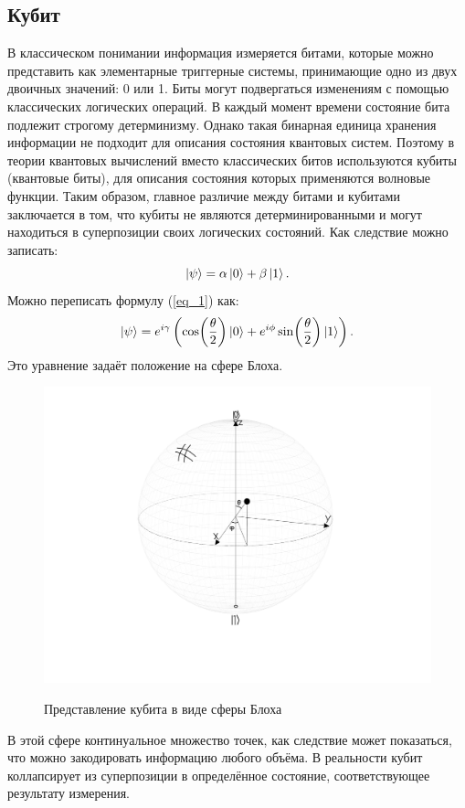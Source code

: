 \documentclass[12pt,a4paper]{article}
\begin{document}
	\subsection{Кубит}
	В классическом понимании информация измеряется битами, которые можно представить как элементарные триггерные системы, принимающие одно из двух двоичных значений: 0 или 1. Биты могут подвергаться изменениям с помощью классических логических операций. В каждый момент времени состояние бита подлежит строгому детерминизму. Однако такая бинарная единица хранения информации не подходит для описания состояния квантовых систем. Поэтому в теории квантовых вычислений вместо классических битов используются кубиты (квантовые биты), для описания состояния которых применяются волновые функции. Таким образом, главное различие между битами и кубитами заключается в том, что кубиты не являются детерминированными и могут находиться в суперпозиции своих логических состояний\cite{1}.
	Как следствие можно записать:\\
	\begin{equation} \label{eq_1}
		\ket{\psi}=\alpha\ket{0}+\beta\ket{1}.
	\end{equation}
	Можно переписать формулу (\ref{eq_1}) как:
	\begin{equation} \label{eq_2}
		\ket{\psi}=e^{i\gamma}\left(\cos(\frac{\theta}{2})\ket{0}+e^{i\phi}\sin(\frac{\theta}{2})\ket{1}\right).
	\end{equation}
	Это уравнение задаёт положение на сфере Блоха. \\
	\begin{figure}[h!]
		\centering
		\includegraphics[width=0.7\linewidth]{2.jpg}
		\label{fig_2}\caption{Представление кубита в виде сферы Блоха}
	\end{figure}
	
	В этой сфере континуальное множество точек, как следствие может показаться, что можно закодировать информацию любого объёма. В реальности кубит коллапсирует из суперпозиции в определённое состояние, соответствующее результату измерения.\\
	
\end{document}
